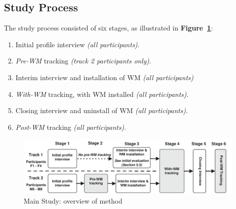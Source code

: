 

	

\subsection{Study Process}
\label{main-study:overview}

The study process consisted of six stages, as illustrated in \textbf{Figure~\ref{fig:main-study:method-overview}}:
\begin{enumerate}
\item Initial profile interview \textit{(all participants)}.
\item \textit{Pre-WM} tracking \textit{(track 2 participants only)}.
\item Interim interview and installation of WM \textit{(all participants)}
\item \textit{With-WM} tracking, with WM installed \textit{(all participants)}.
\item Closing interview and uninstall of WM \textit{(all participants)}.
\item \textit{Post-WM} tracking \textit{(all participants)}.
\end{enumerate}

\begin{figure}[t]
	\begin{center}
		\leavevmode
		\includegraphics[width=\textwidth]{pictures/main-study/main-study-method.pdf}
	\end{center}
	\caption{Main Study: overview of method}
	\label{fig:main-study:method-overview}
\end{figure}

